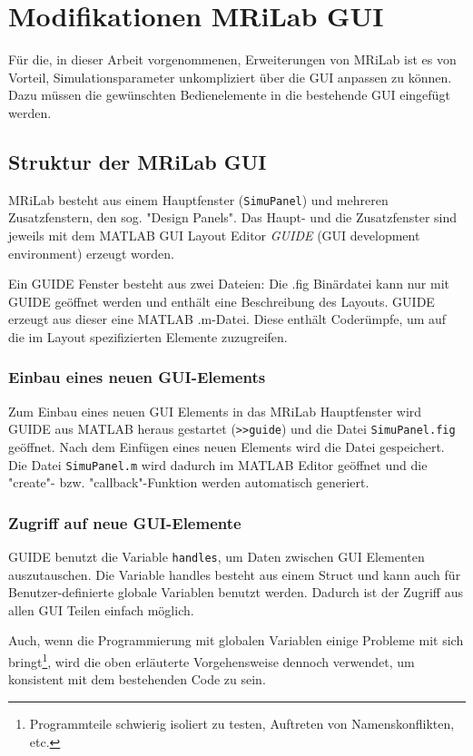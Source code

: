 \section{Modifikationen MRiLab GUI}%
Für die, in dieser Arbeit vorgenommenen, Erweiterungen von MRiLab ist es von Vorteil, Simulationsparameter unkompliziert über die GUI anpassen zu können. Dazu müssen die gewünschten Bedienelemente in die bestehende GUI eingefügt werden.

\subsection{Struktur der MRiLab GUI}
MRiLab besteht aus einem Hauptfenster (\texttt{SimuPanel}) und mehreren Zusatzfenstern, den sog. "Design Panels". Das Haupt- und die Zusatzfenster sind jeweils mit dem MATLAB GUI Layout Editor \textit{GUIDE} (GUI development environment) erzeugt worden.

Ein GUIDE Fenster besteht aus zwei Dateien: Die .fig Binärdatei kann nur mit GUIDE geöffnet werden und enthält eine Beschreibung des Layouts. GUIDE erzeugt aus dieser eine MATLAB .m-Datei. Diese enthält Coderümpfe, um auf die im Layout spezifizierten Elemente zuzugreifen.

\subsubsection{Einbau eines neuen GUI-Elements}
Zum Einbau eines neuen GUI Elements in das MRiLab Hauptfenster wird GUIDE aus MATLAB heraus gestartet (\texttt{>>guide}) und die Datei \texttt{SimuPanel.fig} geöffnet. Nach dem Einfügen eines neuen Elements wird die Datei gespeichert. Die Datei \texttt{SimuPanel.m} wird dadurch im MATLAB Editor geöffnet und die "create"- bzw. "callback"-Funktion werden automatisch generiert.

\subsubsection{Zugriff auf neue GUI-Elemente}
GUIDE benutzt die Variable \texttt{handles}, um Daten zwischen GUI Elementen auszutauschen. Die Variable handles besteht aus einem Struct und kann auch für Benutzer-definierte globale Variablen benutzt werden. Dadurch ist der Zugriff aus allen GUI Teilen einfach möglich.

Auch, wenn die Programmierung mit globalen Variablen einige Probleme mit sich bringt\footnote{Programmteile schwierig isoliert zu testen, Auftreten von Namenskonflikten, etc.}, wird die oben erläuterte Vorgehensweise dennoch verwendet, um konsistent mit dem bestehenden Code zu sein.


